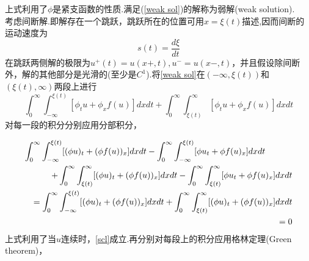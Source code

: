 上式利用了$\phi$是紧支函数的性质.满足(\ref{weak sol})的解称为弱解(weak solution).
\\
考虑间断解.即解存在一个跳跃，跳跃所在的位置可用$x=\xi(t)$描述,因而间断的运动速度为
	\begin{equation}
		s(t)=\frac{d\xi}{dt}
	\end{equation}
在跳跃两侧解的极限为$u^{+}(t)=u(x+,t),u^{-}=u(x-,t)$，并且假设除间断外，解的其他部分是光滑的(至少是$C^1$).将\ref{weak sol}在$(-\infty,\xi(t))$和$(\xi(t),\infty)$两段上进行
	\begin{equation}
		\int_0^{\infty}\int_{-\infty}^{\xi(t)}[\phi_t u + \phi_x f(u)] dxdt+ \int_0^{\infty}\int_{\xi(t)}^{\infty} [\phi_t u + \phi_x f(u)] dxdt
	\end{equation}
对每一段的积分分别应用分部积分，
	
	\begin{eqnarray} \label{by parts}
		\lefteqn{\int_0^{\infty}\int_{-\infty}^{\xi(t)} [(\phi u)_t + (\phi f(u))_x] dxdt  -  \int_0^{\infty}\int_{-\infty}^{\xi(t)}[\phi u_t  +   \phi f(u)_x] dxdt} 
		\nonumber \\
		& & +				\int_0^{\infty}\int_{\xi(t)}^{\infty} [(\phi u)_t +  (\phi f(u))_x] dxdt  -  \int_0^{\infty}\int_{\xi(t)}^{\infty}[\phi u_t + \phi f(u)_x] dxdt \nonumber \\
		& & = \int_0^{\infty}\int_{-\infty}^{\xi(t)} [(\phi u)_t + (\phi f(u))_x] dxdt  +  \int_0^{\infty}\int_{\xi(t)}^{\infty} [(\phi u)_t +  (\phi f(u))_x] dxdt \nonumber \\
		& & = 0
	\end{eqnarray}
上式利用了当$u$连续时，\ref{scl}成立.再分别对每段上的积分应用格林定理(Green theorem)，
	
